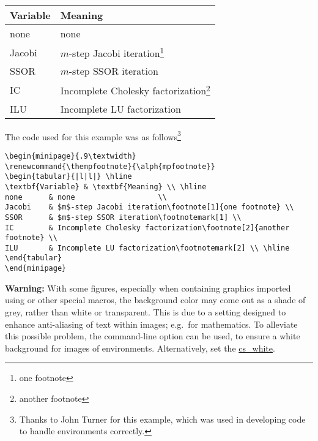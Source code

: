 \medskip
\begin{minipage}{.9\textwidth}
\renewcommand{\thempfootnote}{\alph{mpfootnote}}
\begin{tabular}{|l|l|} \hline
\textbf{Variable} & \textbf{Meaning} \\ \hline
none      & none                   \\
Jacobi    & $m$-step Jacobi iteration\footnote[1]{one footnote} \\
SSOR      & $m$-step SSOR iteration\footnotemark[1] \\
IC        & Incomplete Cholesky factorization\footnote[2]{another footnote} \\
ILU       & Incomplete LU factorization\footnotemark[2] \\ \hline
\end{tabular}
\end{minipage}

\bigskip\noindent
The code used for this example was as follows\footnote{%
Thanks to John Turner  for this example, 
which was used in developing
code to handle  environments correctly.}
\begin{small}
\begin{verbatim}
\begin{minipage}{.9\textwidth}
\renewcommand{\thempfootnote}{\alph{mpfootnote}}
\begin{tabular}{|l|l|} \hline
\textbf{Variable} & \textbf{Meaning} \\ \hline
none      & none                   \\
Jacobi    & $m$-step Jacobi iteration\footnote[1]{one footnote} \\
SSOR      & $m$-step SSOR iteration\footnotemark[1] \\
IC        & Incomplete Cholesky factorization\footnote[2]{another footnote} \\
ILU       & Incomplete LU factorization\footnotemark[2] \\ \hline
\end{tabular}
\end{minipage}
\end{verbatim}
\end{small}

\bigskip\noindent
\textbf{Warning: }
With some figures, especially when containing graphics imported using
 or other special macros, the background color
may come out as a shade of grey, rather than white or transparent.
This is due to a setting designed to enhance anti-aliasing of text
within images; e.g.\ for mathematics.
To alleviate this possible problem, the  command-line option
can be used, to ensure a white background for images of 
environments. 
Alternatively, set the  
\hyperref{variable}{variable (see section }{)}{cs_white}.


